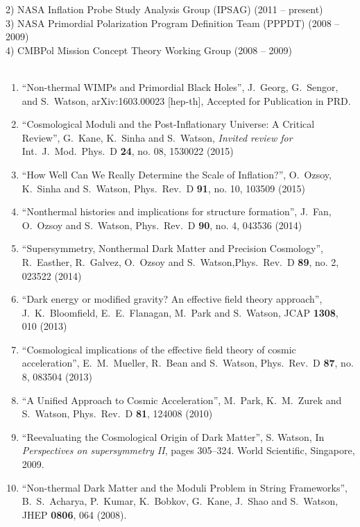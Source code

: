 \documentclass[useAMS,12pt]{article}
\begin{document}
2) NASA Inflation Probe Study Analysis Group (IPSAG) (2011 -- present)\\[-0.3cm]

3) NASA Primordial Polarization Program Definition Team (PPPDT) (2008 -- 2009)\\[-0.3cm]

4) CMBPol Mission Concept Theory Working Group (2008 -- 2009)\\

\bigskip
{} \\[-0.3cm]

\begin{enumerate}
\item{``Non-thermal WIMPs and Primordial Black Holes'',
J.~Georg, G.~Sengor, and S.~Watson,
 arXiv:1603.00023 [hep-th], Accepted for Publication in PRD.}
\item{  ``Cosmological Moduli and the Post-Inflationary Universe: A Critical Review'',
G.~Kane, K.~Sinha and S.~Watson, {\it Invited review for} Int.\ J.\ Mod.\ Phys.\ D {\bf 24}, no. 08, 1530022 (2015)}
\item{``How Well Can We Really Determine the Scale of Inflation?'', O.~Ozsoy, K.~Sinha and S.~Watson, Phys.\ Rev.\ D {\bf 91}, no. 10, 103509 (2015)}
\item{``Nonthermal histories and implications for structure formation'',
J.~Fan, O.~Ozsoy and S.~Watson, Phys.\ Rev.\ D {\bf 90}, no. 4, 043536 (2014)}
\item{``Supersymmetry, Nonthermal Dark Matter and Precision Cosmology'',
R.~Easther, R.~Galvez, O.~Ozsoy and S.~Watson,Phys.\ Rev.\ D {\bf 89}, no. 2, 023522 (2014)}
\item{  ``Dark energy or modified gravity?  An effective field theory approach'',
J.~K.~Bloomfield, E.~E.~Flanagan, M.~Park and S.~Watson,
JCAP {\bf 1308}, 010 (2013)}
\item{``Cosmological implications of the effective field theory of cosmic acceleration'',
E.~M.~Mueller, R.~Bean and S.~Watson, Phys.\ Rev.\ D {\bf 87}, no. 8, 083504 (2013)}
\item{``A Unified Approach to Cosmic Acceleration'', M.~Park, K.~M.~Zurek and S.~Watson,
Phys.\ Rev.\ D {\bf 81}, 124008 (2010)}
\item{  ``Reevaluating the Cosmological Origin of Dark Matter'',
S. Watson,
In {\em Perspectives on supersymmetry II},
pages 305--324. World Scientific, Singapore, 2009.}
\item{``Non-thermal Dark Matter and the Moduli Problem in String Frameworks'',
  B.~S.~Acharya, P.~Kumar, K.~Bobkov, G.~Kane, J.~Shao and S.~Watson,
  JHEP {\bf 0806}, 064 (2008).}
\end{enumerate}
\end{document}
